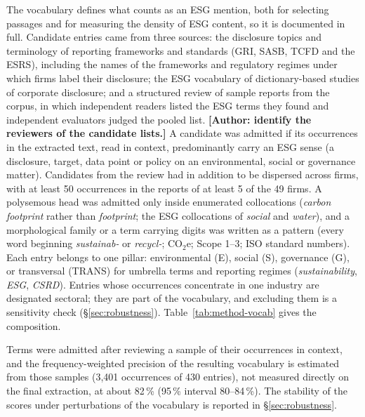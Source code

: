 The vocabulary defines what counts as an ESG mention, both for selecting
passages and for measuring the density of ESG content, so it is documented in full. Candidate
entries came from three sources: the disclosure topics and terminology of
reporting frameworks and standards (GRI, SASB, TCFD and the ESRS), including
the names of the frameworks and regulatory regimes under which firms label
their disclosure; the ESG vocabulary of dictionary-based studies of corporate
disclosure; and a structured review of sample reports from the corpus, in which
independent readers listed the ESG terms they found and independent evaluators
judged the pooled list.
\textbf{[Author: identify the reviewers of the candidate lists.]}
A candidate was admitted if its occurrences in the extracted text, read in
context, predominantly carry an ESG sense (a disclosure, target, data point or
policy on an environmental, social or governance matter). Candidates from the
review had in addition to be dispersed across firms, with at least 50
occurrences in the reports of at least 5 of the 49 firms. A polysemous head was
admitted only inside enumerated collocations (\emph{carbon footprint} rather
than \emph{footprint}; the ESG collocations of \emph{social} and \emph{water}),
and a morphological family or a term carrying digits was written as a pattern
(every word beginning \emph{sustainab-} or \emph{recycl-}; CO$_2$e; Scope 1--3;
ISO standard numbers). Each entry belongs to one pillar: environmental (E),
social (S), governance (G), or transversal (TRANS) for umbrella terms and
reporting regimes (\emph{sustainability}, \emph{ESG}, \emph{CSRD}). Entries
whose occurrences concentrate in one industry are designated sectoral; they are
part of the vocabulary, and excluding them is a sensitivity check
(\S\ref{sec:robustness}). Table~\ref{tab:method-vocab} gives the composition.

Terms were admitted after reviewing a sample of their occurrences in context,
and the frequency-weighted precision of the resulting vocabulary is estimated
from those samples (3,401 occurrences of 430 entries), not measured directly
on the final extraction, at about 82\,\% (95\,\% interval 80--84\,\%). The stability of the scores under perturbations of the vocabulary is
reported in \S\ref{sec:robustness}.

